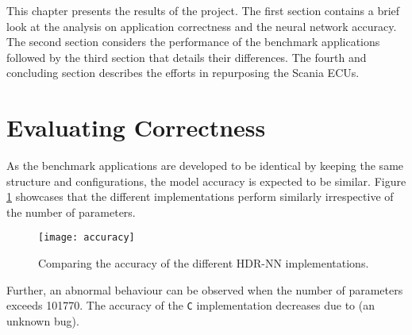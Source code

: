 This chapter presents the results of the project. The first section contains a brief look at the analysis on application correctness and the neural network accuracy. The second section considers the performance of the benchmark applications followed by the third section that details their differences. The fourth and concluding section describes the efforts in repurposing the Scania ECUs.



\section{Evaluating Correctness}


As the benchmark applications are developed to be identical by keeping the same structure and configurations, the model accuracy is expected to be similar. Figure \ref{hdrnn-accuracy} showcases that the different implementations perform similarly irrespective of the number of parameters.

\begin{figure}[!ht]
	\centering
	\texttt{[image: accuracy]}
	\caption[HDR-NN Accuracy]{Comparing the accuracy of the different HDR-NN implementations.}
	\label{hdrnn-accuracy}
\end{figure}

Further, an abnormal behaviour can be observed when the number of parameters exceeds 101770. The accuracy of the \texttt{C} implementation decreases due to (an unknown bug).


